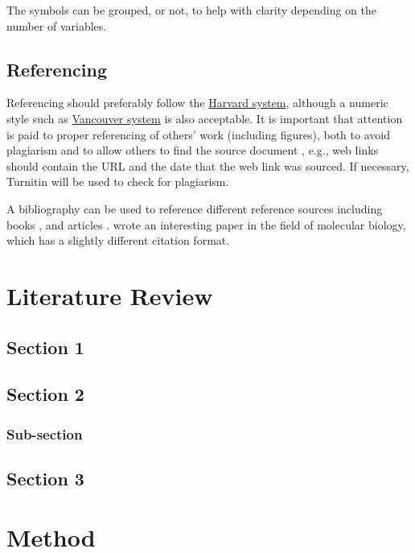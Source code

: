 \documentclass[a4paper,oneside,12pt]{book}
\begin{document}
The symbols can be grouped, or not, to help with clarity depending on the number of variables.


\section{Referencing}
Referencing should preferably follow the \href{https://library.aru.ac.uk/referencing/harvard.htm}{Harvard system}, although a numeric style such as \href{https://en.wikipedia.org/wiki/Vancouver_system}{Vancouver system} is also acceptable. It is important that attention is paid to proper referencing of others' work (including figures), both to avoid plagiarism and to allow others to find the source document \citep{blackholes}, e.g., web links should contain the URL and the date that the web link was sourced. If necessary, Turnitin will be used to check for plagiarism.

A bibliography can be used to reference different reference sources including books \citep{book:goossens93}, and articles \citep{art:AbedonHymanThomas2003,art:greenwade93}. \citet{proc:Abedon1994} wrote an interesting paper in the field of molecular biology, which has a slightly different citation format.

\chapter{Literature Review}
\section{Section 1}

\section{Section 2}
\subsection{Sub-section}

\section{Section 3}

\chapter{Method}
\end{document}
